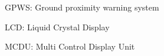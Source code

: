 
     GPWS: Ground proximity warning system

	LCD: Liquid Crystal Display


	MCDU: Multi Control Display Unit




